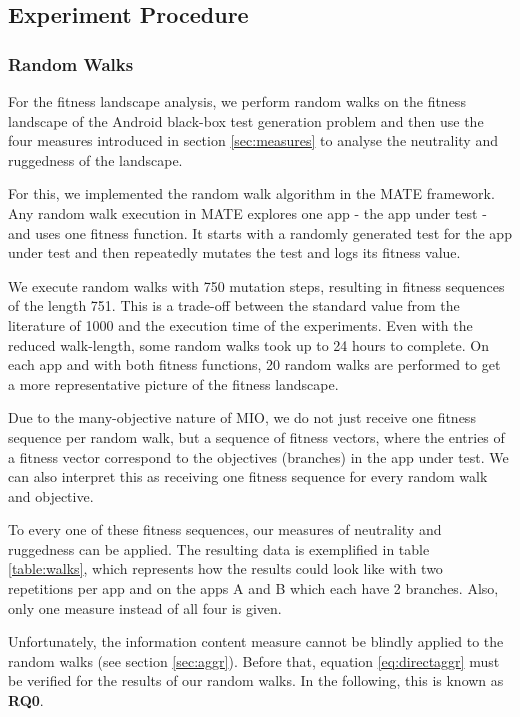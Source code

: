 \subsection{Experiment Procedure}

\subsubsection{Random Walks}
For the fitness landscape analysis, we perform random walks on the fitness landscape of the Android black-box test generation problem and then use the four measures introduced in section \ref{sec:measures} to analyse the neutrality and ruggedness of the landscape.

For this, we implemented the random walk algorithm in the MATE framework. Any random walk execution in MATE explores one app - the app under test - and uses one fitness function. It starts with a randomly generated test for the app under test and then repeatedly mutates the test and logs its fitness value.

We execute random walks with 750 mutation steps, resulting in fitness sequences of the length 751. This is a trade-off between the standard value from the literature of 1000 \cite{lio} and the execution time of the experiments. Even with the reduced walk-length, some random walks took up to 24 hours to complete. On each app and with both fitness functions, 20 random walks are performed to get a more representative picture of the fitness landscape.

Due to the many-objective nature of MIO, we do not just receive one fitness sequence per random walk, but a sequence of fitness vectors, where the entries of a fitness vector correspond to the objectives (branches) in the app under test. We can also interpret this as receiving one fitness sequence for every random walk and objective. 

To every one of these fitness sequences, our measures of neutrality and ruggedness can be applied. The resulting data is exemplified in table \ref{table:walks}, which represents how the results could look like with two repetitions per app and on the apps A and B which each have 2 branches. Also, only one measure instead of all four is given.

Unfortunately, the information content measure cannot be blindly applied to the random walks (see section \ref{sec:aggr}).
Before that, equation \ref{eq:directaggr} must be verified for the results of our random walks.
In the following, this is known as \textbf{RQ0}.


